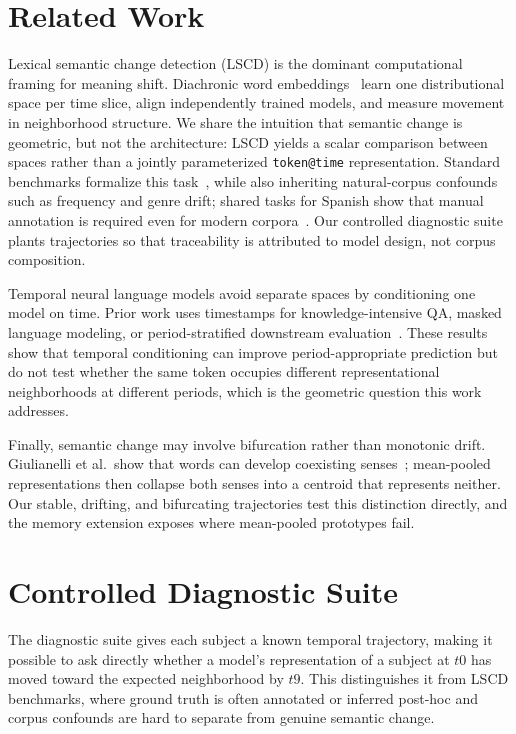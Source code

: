 \documentclass[runningheads]{llncs}
\begin{document}
\section{Related Work}
Lexical semantic change detection (LSCD) is the dominant computational framing
for meaning shift. Diachronic word embeddings~\cite{hamilton2016diachronic}
learn one distributional space per time slice, align independently trained
models, and measure movement in neighborhood structure. We share the intuition
that semantic change is geometric, but not the architecture: LSCD yields a
scalar comparison between spaces rather than a jointly parameterized
\texttt{token@time} representation. Standard benchmarks formalize this
task~\cite{schlechtweg2020semeval,tahmasebi2021survey}, while also inheriting
natural-corpus confounds such as frequency and genre drift; shared tasks for
Spanish show that manual annotation is required even for modern
corpora~\cite{zamora2022lscdiscovery}. Our controlled diagnostic suite plants trajectories so that traceability is
attributed to model design, not corpus composition.

Temporal neural language models avoid separate spaces by conditioning one model
on time. Prior work uses timestamps for knowledge-intensive QA, masked language
modeling, or period-stratified downstream
evaluation~\cite{dhingra2022timeaware,rosin2022timemasking,loureiro2022timelms}. These results show that temporal conditioning can improve period-appropriate
prediction but do not test whether the same token occupies different
representational neighborhoods at different periods, which is the geometric
question this work addresses.

Finally, semantic change may involve bifurcation rather than monotonic drift.
Giulianelli et al.\ show that words can develop coexisting
senses~\cite{giulianelli2020analysing}; mean-pooled representations then collapse
both senses into a centroid that represents neither. Our stable, drifting, and
bifurcating trajectories test this distinction directly, and the memory
extension exposes where mean-pooled prototypes fail.

\section{Controlled Diagnostic Suite}
The diagnostic suite gives each subject a known temporal trajectory, making it
possible to ask directly whether a model's representation of a subject at \(t0\)
has moved toward the expected neighborhood by \(t9\). This distinguishes it from
LSCD benchmarks, where ground truth is often annotated or
inferred post-hoc and corpus confounds are hard to separate from genuine semantic
change.
\end{document}
